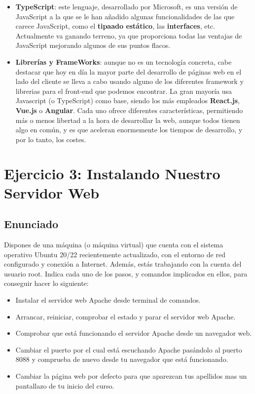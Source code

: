 \begin{itemize}
\begin{itemize}
        \item \textbf{TypeScript}: este lenguaje, desarrollado por Microsoft, es una versión de JavaScript a la que se le han añadido algunas funcionalidades de las que carece JavaScript, como el \textbf{tipaado estático}, las \textbf{interfaces}, etc. Actualmente va ganando terreno, ya que proporciona todas las ventajas de JavaScript mejorando algunos de sus puntos flacos.

        \item \textbf{Librerías y FrameWorks}: aunque no es un tecnología concreta, cabe destacar que hoy en día la mayor parte del desarrollo de páginas web en el lado del cliente se lleva a cabo usando alguno de los diferentes framework y librerias para el front-end que podemos encontrar. La gran mayoría usa Javascript (o TypeScript) como base, siendo los más empleados \textbf{React.js}, \textbf{Vue.js} o \textbf{Angular}. Cada uno ofrece diferentes características, permitiendo más o menos libertad a la hora de desarrollar la web, aunque todos tienen algo en común, y es que aceleran enormemente los tiempos de desarrollo, y por lo tanto, los costes.
    \end{itemize}
\end{itemize}

\section{Ejercicio 3: Instalando Nuestro Servidor Web}
\subsection{Enunciado}
Dispones de una máquina (o máquina virtual) que cuenta con el sistema operativo Ubuntu 20/22 recientemente actualizado, con el entorno de red configurado y conexión a Internet. Además, estás trabajando con la cuenta del usuario root. Indica cada uno de los pasos, y comandos implicados en ellos, para conseguir hacer lo siguiente:

\begin{itemize}
    \item Instalar el servidor web Apache desde terminal de comandos.
    \item Arrancar, reiniciar, comprobar el estado y parar el servidor web Apache.
    \item Comprobar que está funcionando el servidor Apache desde un navegador web.
    \item Cambiar el puerto por el cual está escuchando Apache pasándolo al puerto 8088 y comprueba de nuevo desde tu navegador que está funcionando.
    \item Cambiar la página web por defecto para que aparezcan tus apellidos mas un pantallazo de tu inicio del curso.
\end{itemize}

